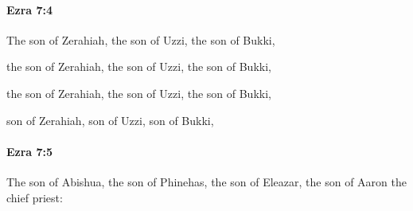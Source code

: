 		\paragraph{Ezra 7:4} %
			\label{EZRA-7-4}

			The son of Zerahiah, the son of Uzzi, the son of Bukki,

			\begin{versebox}
					\item[BHS] 
					\item[LXX] 
					\item[ASV] the son of Zerahiah, the son of Uzzi, the son of Bukki,
					\item[NIV] the son of Zerahiah, the son of Uzzi, the son of Bukki,
					\item[NRSV] son of Zerahiah, son of Uzzi, son of Bukki,
			\end{versebox}

		\paragraph{Ezra 7:5} %
			\label{EZRA-7-5}

			The son of Abishua, the son of Phinehas, the son of Eleazar, the son of Aaron the chief priest:

